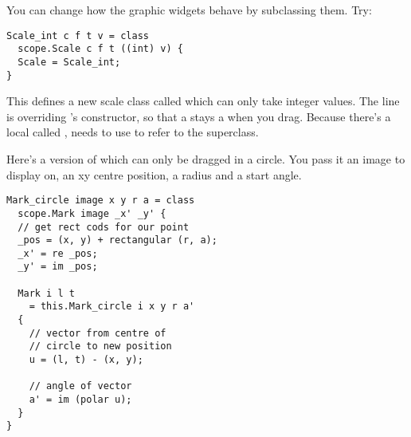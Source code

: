 You can change how the graphic widgets behave by subclassing them. Try:

\begin{verbatim}
Scale_int c f t v = class
  scope.Scale c f t ((int) v) {
  Scale = Scale_int;
}
\end{verbatim}

\noindent
This defines a new scale class called  which can only take
integer values. The  line is 
overriding 's constructor, so that a  stays a
 when you drag. Because there's a local called ,
 needs to use  to refer to the superclass.

Here's a version of  which can only be dragged in a circle. You pass
it an image to display on, an xy centre position, a radius and a start angle.

\begin{verbatim}
Mark_circle image x y r a = class 
  scope.Mark image _x' _y' {
  // get rect cods for our point
  _pos = (x, y) + rectangular (r, a);
  _x' = re _pos;
  _y' = im _pos;

  Mark i l t 
    = this.Mark_circle i x y r a'
  {
    // vector from centre of
    // circle to new position
    u = (l, t) - (x, y);

    // angle of vector
    a' = im (polar u);
  }
}
\end{verbatim}


